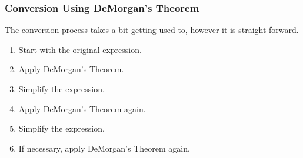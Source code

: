 \documentclass[12pt]{article}
\begin{document}
\subsubsection{Conversion Using DeMorgan's Theorem}
The conversion process takes a bit getting used to, however it is straight forward.
\begin{enumerate}
	\item Start with the original expression.
	\item Apply DeMorgan's Theorem.
	\item Simplify the expression.
	\item Apply DeMorgan's Theorem again.
	\item Simplify the expression.
	\item If necessary, apply DeMorgan's Theorem again.
\end{enumerate}
\end{document}
